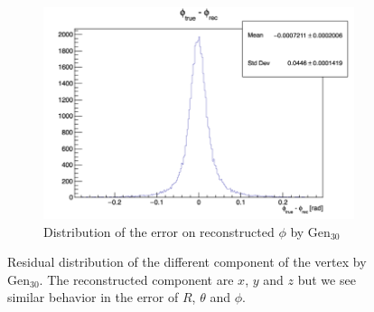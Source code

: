 \documentclass[../main.tex]{subfiles}
\begin{document}
\begin{figure}[ht]
\begin{subfigure}[t]{0.32\linewidth}
    \includegraphics[width=\linewidth]{images/jcnn/vic_cnn/cnn_delta_phi.png}
    \caption{Distribution of the error on reconstructed $\phi$ by $\mathrm{Gen}_{30}$}
    \label{fig:jcnn:vic_cnn:cnn_delta_phi}
  \end{subfigure}
  \caption{Residual distribution of the different component of the vertex by $\mathrm{Gen}_{30}$. The reconstructed component are $x$, $y$ and $z$ but we see similar behavior in the error of $R$, $\theta$ and $\phi$.}
  \label{fig:jcnn:vic_cnn:cnn_perf}
\end{figure}
\end{document}
